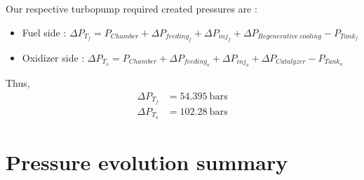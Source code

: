 Our respective turbopump required created pressures are : 
\begin{itemize}
	\item Fuel side : $\Delta P_{T_f} = P_{Chamber} + \Delta P_{feeding_f} + \Delta P_{inj_f} + \Delta P_{Regenerative\ cooling} - P_{Tank_f}$
	\item Oxidizer side : 	$\Delta P_{T_o} = P_{Chamber} + \Delta P_{feeding_o} + \Delta P_{inj_o} + \Delta P_{Catalyzer} - P_{Tank_o}$
\end{itemize}
Thus,
\begin{align}
\Delta P_{T_f} &= 54.395\ \text{bars}\\
\Delta P_{T_o} &= 102.28\ \text{bars}
\end{align}
\section{Pressure evolution summary}
